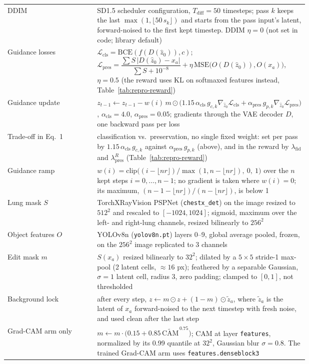 \begin{table}[p]
\begin{tabular}{@{}l p{0.70\linewidth}@{}}
DDIM & SD1.5 scheduler configuration, $T_{\text{diff}} = 50$ timesteps; pass $k$ keeps the last $\max(1, \lfloor 50\, s_k \rfloor)$ and starts from the pass input's latent, forward-noised to the first kept timestep. DDIM $\eta = 0$ (not set in code; library default) \\
Guidance losses & $\mathcal{L}_{\text{cls}} = \mathrm{BCE}(f(D(\hat z_0)), c)$; $\mathcal{L}_{\text{pres}} = \dfrac{\sum S\,|D(\hat z_0) - x_a|}{\sum S + 10^{-8}} + \eta\,\mathrm{MSE}\big(O(D(\hat z_0)), O(x_a)\big)$, $\eta = 0.5$ (the reward uses KL on softmaxed features instead, Table~\ref{tab:repro-reward}) \\
Guidance update & $z_{t-1} \leftarrow z_{t-1} - w(i)\, m \odot \big(1.15\,\alpha_{\text{cls}}\, g_{c,k} \nabla_{\hat z_0}\mathcal{L}_{\text{cls}} + \alpha_{\text{pres}}\, g_{p,k} \nabla_{\hat z_0}\mathcal{L}_{\text{pres}}\big)$, $\alpha_{\text{cls}} = 4.0$, $\alpha_{\text{pres}} = 0.05$; gradients through the VAE decoder $D$, one backward pass per loss \\
Trade-off in Eq.~1 & classification vs.\ preservation, no single fixed weight: set per pass by $1.15\,\alpha_{\text{cls}}\, g_{c,k}$ against $\alpha_{\text{pres}}\, g_{p,k}$ (above), and in the reward by $\lambda_{\text{fid}}$ and $\lambda_{\text{pres}}^{R}$ (Table~\ref{tab:repro-reward}) \\ %
Guidance ramp & $w(i) = \mathrm{clip}\big((i - \lfloor n r \rfloor) / \max(1, n - \lfloor n r \rfloor),\ 0,\ 1\big)$ over the $n$ kept steps $i = 0, \dots, n-1$; no gradient is taken where $w(i) = 0$; its maximum, $(n - 1 - \lfloor nr \rfloor)/(n - \lfloor nr \rfloor)$, is below 1 \\
Lung mask $S$ & TorchXRayVision PSPNet (\texttt{chestx\_det}) on the image resized to $512^2$ and rescaled to $[-1024, 1024]$; sigmoid, maximum over the left- and right-lung channels, resized bilinearly to $256^2$ \\
Object features $O$ & YOLOv8n (\texttt{yolov8n.pt}) layers 0--9, global average pooled, frozen, on the $256^2$ image replicated to 3 channels \\
Edit mask $m$ & $S(x_a)$ resized bilinearly to $32^2$; dilated by a $5 \times 5$ stride-1 max-pool (2 latent cells, $\approx 16$ px); feathered by a separable Gaussian, $\sigma = 1$ latent cell, radius 3, zero padding; clamped to $[0, 1]$, not thresholded \\
Background lock & after every step, $z \leftarrow m \odot z + (1 - m) \odot \tilde z_a$, where $\tilde z_a$ is the latent of $x_a$ forward-noised to the next timestep with fresh noise, and used clean after the last step \\
Grad-CAM arm only & $m \leftarrow m \cdot \big(0.15 + 0.85\,\widetilde{\text{CAM}}^{\,0.75}\big)$; CAM at layer \texttt{features}, normalized by its 0.99 quantile at $32^2$, Gaussian blur $\sigma = 0.8$. The trained Grad-CAM arm uses \texttt{features.denseblock3} \\
\bottomrule
\end{tabular}
\end{table}

